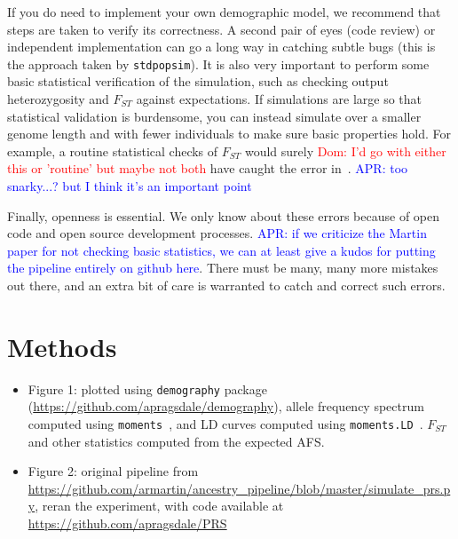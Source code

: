 \documentclass{article}
\newcommand{\stdpopsim}[0]{\texttt{stdpopsim}}
\newcommand{\aprcomment}[1]{{\textcolor{blue}{APR: #1}}}
\newcommand{\dncomment}[1]{{\textcolor{red}{Dom: #1}}}
\begin{document}
If you do need to implement your own demographic model, we recommend that steps are taken to 
verify its correctness. A second pair of eyes (code review) or independent implementation 
can go a long way in catching subtle bugs (this is the approach taken by \stdpopsim). It is also 
very important to perform some basic statistical verification of the simulation, such as checking 
output heterozygosity and $F_{ST}$ against expectations. If simulations are large so that 
statistical validation is burdensome, you can instead simulate over a smaller genome length 
and with fewer individuals to make sure basic properties hold. For example, a routine statistical 
checks of $F_{ST}$ would surely 
\dncomment{I'd go with either this or 'routine' but maybe not both
}
have caught the error in~\citet{martin2017human}. 
\aprcomment{too snarky...? but I think it's an important point}

Finally, openness is essential. We only know about these errors because of open code and 
open source development processes. \aprcomment{if we criticize the Martin paper for not
checking basic statistics, we can at least give a kudos for putting the pipeline entirely on
github here}. There must be many, many more mistakes out there, and an extra bit of care 
is warranted to catch and correct such errors. 

\section{Methods}

\begin{itemize}
\item Figure 1: plotted using \texttt{demography} package (\url{https://github.com/apragsdale/demography}),
allele frequency spectrum computed using \texttt{moments}~\cite{jouganous2017inferring}, and LD curves
computed using \texttt{moments.LD}~\cite{ragsdale2019models}. $F_{ST}$ and other statistics computed
from the expected AFS.
\item Figure 2: original pipeline from \url{https://github.com/armartin/ancestry_pipeline/blob/master/simulate_prs.py},
reran the experiment, with code available at \url{https://github.com/apragsdale/PRS}
\end{itemize}




\pagebreak
\end{document}
